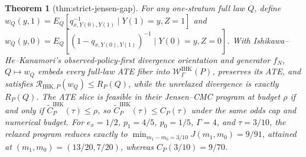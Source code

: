 \documentclass{article}
\newtheorem{theorem}{Theorem}
\begin{document}
\begin{theorem}[thm:strict-jensen-gap]\label{thm:strict-jensen-gap}
For any one-stratum full law \(Q\), define \(w_Q(y,1)=E_Q[q_{x,Y(0),Y(1)}^{-1}\mid Y(1)=y,Z=1]\) and \(w_Q(y,0)=E_Q[(1-q_{x,Y(0),Y(1)})^{-1}\mid Y(0)=y,Z=0]\). With Ishikawa--He--Kanamori's observed-policy-first divergence orientation and generator \(f_N\), \(Q\mapsto w_Q\) embeds every full-law ATE fiber into \(\mathcal W^{\mathrm{IHK}}_{\Gamma}(P)\), preserves its ATE, and satisfies \(\mathscr R_{\mathrm{IHK},P}(w_Q)\leq R_P(Q)\), while the unrelaxed divergence is exactly \(R_P(Q)\). The ATE slice is feasible in their Jensen--CMC program at budget \(\rho\) if and only if \(\widetilde C^{\mathrm{IHK}}_P(\tau)\leq\rho\), so \(\widetilde C^{\mathrm{IHK}}_P(\tau)\leq C_P(\tau)\) under the same odds cap and numerical budget. For \(e_x=1/2\), \(p_1=4/5\), \(p_0=1/5\), \(\Gamma=4\), and \(\tau=3/10\), the relaxed program reduces exactly to \(\min_{m_1-m_0=3/10}J(m_1,m_0)=9/91\), attained at \((m_1,m_0)=(13/20,7/20)\), whereas \(C_P(3/10)=9/70\).
\end{theorem}
\end{document}
